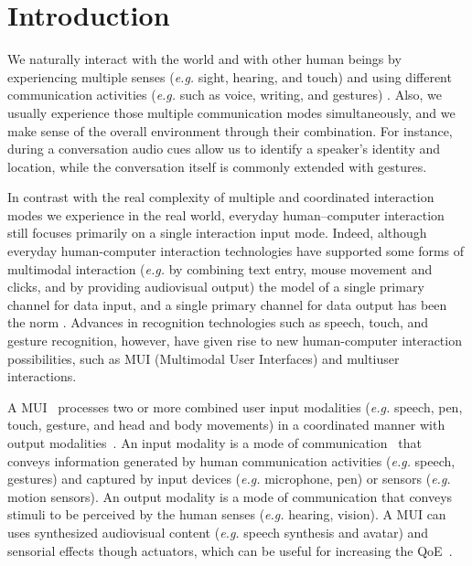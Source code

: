 \documentclass[
  doutorado,
  american
]{ThesisPUC}
\begin{document}
\chapter{Introduction}
\label{chp:intro}

We naturally interact with the world and with other human beings by experiencing
multiple senses (\textit{e.g.} sight, hearing, and touch) and using different 
communication activities (\textit{e.g.} such as voice, writing, and gestures) 
\cite{jaimes_multimodal_2007}. Also, we usually experience those multiple
communication modes simultaneously, and we make sense of the overall environment
through their combination. For instance, during a conversation audio cues allow
us to identify a speaker’s identity and location, while the conversation itself
is commonly extended with gestures.

In contrast with the real complexity of multiple and coordinated interaction
modes we experience in the real world, everyday human–computer interaction still
focuses primarily on a single interaction input mode. Indeed, although everyday
human-computer interaction technologies have supported some forms of multimodal
interaction (\textit{e.g.} by combining text entry, mouse movement and clicks, and by
providing audiovisual output) the model of a single primary channel for data
input, and a single primary channel for data output has been the norm 
\cite{turk_multimodal_2014}. Advances in recognition technologies such as
speech, touch, and gesture recognition, however, have given rise to new
human-computer interaction possibilities, such as MUI (Multimodal User
Interfaces) and multiuser interactions.

A MUI~\cite{turk_multimodal_2014} processes two or more combined user input
modalities (\textit{e.g.} speech, pen, touch, gesture, and head and body movements) in a
coordinated manner with output modalities~\cite{oviatt_multimodal_2007}. An 
input modality is a mode of
communication~\cite{jaimes_multimodal_2007} that conveys information generated
by human communication activities (\textit{e.g.} speech, gestures) and captured by input
devices (\textit{e.g.} microphone, pen) or sensors (\textit{e.g.} motion sensors). An output
modality is a mode of communication that conveys stimuli to be perceived by the
human senses (\textit{e.g.} hearing, vision). A MUI can uses synthesized audiovisual
content (\textit{e.g.} speech synthesis and avatar) and sensorial effects though
actuators, which can be useful for increasing the 
QoE~\cite{ghinea_mulsemedia:_2014}.
\end{document}
